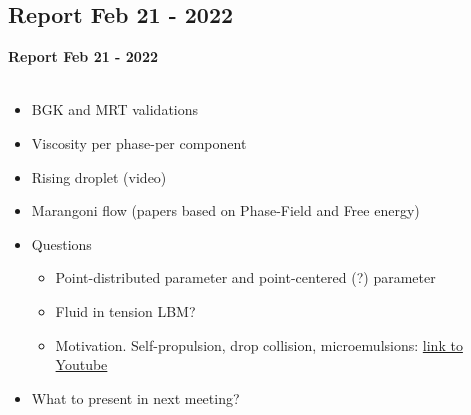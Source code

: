\documentclass[8pt]{beamer}
\begin{document}
	\subsection{Report Feb 21 - 2022}
	\label{}
	\justifying
	\begin{frame}
		\textbf{Report Feb 21 - 2022}\\~\\
		\begin{itemize}
			\item BGK and MRT validations
			\item Viscosity per phase-per component
			\item Rising droplet (video)
			\item Marangoni flow (papers based on Phase-Field and Free energy)
			\item Questions
			\begin{itemize}
				\item Point-distributed parameter and point-centered (?) parameter
				\item Fluid in tension LBM?
				\item Motivation. Self-propulsion, drop collision, microemulsions: \href{https://www.youtube.com/watch?v=arpGntfrg4s}{link to Youtube}
			\end{itemize}
			\item What to present in next meeting?
		\end{itemize}
	\end{frame}
\end{document}
